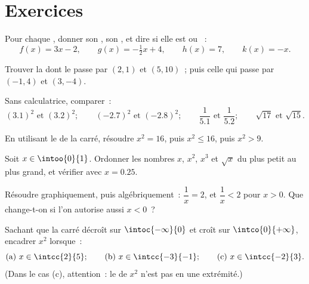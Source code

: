 \section{Exercices}

\begin{exercise}[$\star$]\label{exo:g10:reffunc:1}
Pour chaque , donner son , son
, et dire si elle est  ou ~:
\[
f(x) = 3x - 2, \qquad
g(x) = -\tfrac12 x + 4, \qquad
h(x) = 7, \qquad
k(x) = -x .
\]
\end{exercise}

\begin{exercise}[$\star$]\label{exo:g10:reffunc:2}
Trouver la  dont le  passe par $(2, 1)$ et
$(5, 10)$~; puis celle qui passe par $(-1, 4)$ et $(3, -4)$.
\end{exercise}

\begin{exercise}[$\star$]\label{exo:g10:reffunc:3}
Sans calculatrice, comparer~:
\[
(3.1)^2 \text{ et } (3.2)^2; \qquad
(-2.7)^2 \text{ et } (-2.8)^2; \qquad
\frac{1}{5.1} \text{ et } \frac{1}{5.2}; \qquad
\sqrt{17} \text{ et } \sqrt{15}.
\]
\end{exercise}

\begin{exercise}[$\star$]\label{exo:g10:reffunc:4}
En utilisant le  de la  carré, résoudre $x^2 = 16$,
puis $x^2 \leq 16$, puis $x^2 > 9$.
\end{exercise}

\begin{exercise}[$\star$]\label{exo:g10:reffunc:5}
Soit $x \in \intoo{0}{1}$. Ordonner les nombres $x$, $x^2$, $x^3$ et
$\sqrt x$ du plus petit au plus grand, et vérifier avec $x = 0.25$.
\end{exercise}

\begin{exercise}[$\star\star$]\label{exo:g10:reffunc:6}
Résoudre graphiquement, puis algébriquement~: $\dfrac1x = 2$, et
$\dfrac1x < 2$ pour $x > 0$. Que change-t-on si l'on autorise aussi
$x < 0$~?
\end{exercise}

\begin{exercise}[$\star\star$]\label{exo:g10:reffunc:7}
Sachant que la  carré décroît sur $\intoc{-\infty}{0}$ et croît
sur $\intco{0}{+\infty}$, encadrer $x^2$ lorsque~:
\[
\text{(a) } x \in \intcc{2}{5};
\qquad
\text{(b) } x \in \intcc{-3}{-1};
\qquad
\text{(c) } x \in \intcc{-2}{3}.
\]
(Dans le cas (c), attention~: le  de $x^2$ n'est pas en une
extrémité.)
\end{exercise}

